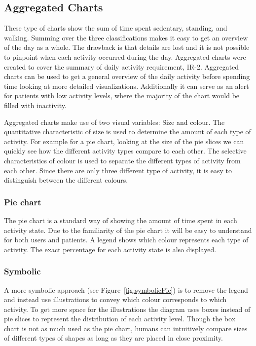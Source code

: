 \subsection{Aggregated Charts}
These type of charts show the sum of time spent sedentary, standing, and walking. Summing over the three classifications makes it easy to get an overview of the day as a whole. The drawback is that details are lost and it is not possible to pinpoint when each activity occurred during the day. Aggregated charts were created to cover the summary of daily activity requirement, IR-2. Aggregated charts can be used to get a general overview of the daily activity before spending time looking at more detailed visualizations. Additionally it can serve as an alert for patients with low activity levels, where the majority of the chart would be filled with inactivity.

Aggregated charts make use of two visual variables: Size and colour. The quantitative characteristic of size is used to determine the amount of each type of activity. For example for a pie chart, looking at the size of the pie slices we can quickly see how the different activity types compare to each other. The selective characteristics of colour is used to separate the different types of activity from each other. Since there are only three different type of activity, it is easy to distinguish between the different colours. 

\subsubsection{Pie chart}
The pie chart is a standard way of showing the amount of time spent in each activity state. Due to the familiarity of the pie chart it will be easy to understand for both users and patients. A legend shows which colour represents each type of activity. The exact percentage for each activity state is also displayed.

\subsubsection{Symbolic}
A more symbolic approach (see Figure~\ref{fig:symbolicPie}) is to remove the legend and instead use illustrations to convey which colour corresponds to which activity. To get more space for the illustrations the diagram uses boxes instead of pie slices to represent the distribution of each activity level. Though the box chart is not as much used as the pie chart, humans can intuitively compare sizes of different types of shapes as long as they are placed in close proximity. 

